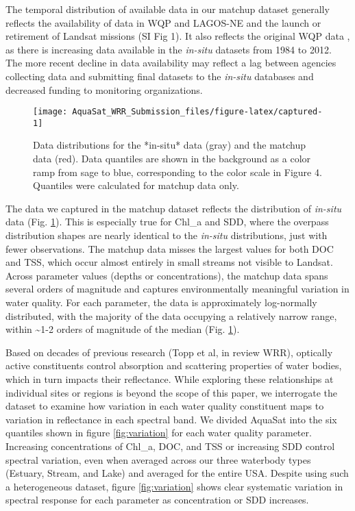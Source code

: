 \documentclass[draft,linenumbers]{agujournal2018}
\begin{document}
The temporal distribution of available data in our matchup dataset
generally reflects the availability of data in WQP and LAGOS-NE and the
launch or retirement of Landsat missions (SI Fig 1). It also reflects
the original WQP data \citep{Read2017}, as there is increasing data
available in the \emph{in-situ} datasets from 1984 to 2012. The more
recent decline in data availability may reflect a lag between agencies
collecting data and submitting final datasets to the \emph{in-situ}
databases and decreased funding \citep{Myers2017} to monitoring
organizations.

\begin{figure}[h]
\texttt{[image: AquaSat\_WRR\_Submission\_files/figure-latex/captured-1]} \caption{Data distributions for the *in-situ* data (gray) and the matchup data (red). Data quantiles are shown in the background as a color ramp from sage to blue, corresponding to the color scale in Figure 4. Quantiles were calculated for matchup data only.}\label{fig:captured}
\end{figure}

The data we captured in the matchup dataset reflects the distribution of
\emph{in-situ} data (Fig. \ref{fig:captured}). This is especially true
for Chl\_a and SDD, where the overpass distribution shapes are nearly
identical to the \emph{in-situ} distributions, just with fewer
observations. The matchup data misses the largest values for both DOC
and TSS, which occur almost entirely in small streams not visible to
Landsat. Across parameter values (depths or concentrations), the matchup
data spans several orders of magnitude and captures environmentally
meaningful variation in water quality. For each parameter, the data is
approximately log-normally distributed, with the majority of the data
occupying a relatively narrow range, within \textasciitilde{}1-2 orders
of magnitude of the median (Fig. \ref{fig:captured}).

Based on decades of previous research (Topp et al, in review WRR),
optically active constituents control absorption and scattering
properties of water bodies, which in turn impacts their reflectance.
While exploring these relationships at individual sites or regions is
beyond the scope of this paper, we interrogate the dataset to examine
how variation in each water quality constituent maps to variation in
reflectance in each spectral band. We divided AquaSat into the six
quantiles shown in figure \ref{fig:variation} for each water quality
parameter. Increasing concentrations of Chl\_a, DOC, and TSS or
increasing SDD control spectral variation, even when averaged across our
three waterbody types (Estuary, Stream, and Lake) and averaged for the
entire USA. Despite using such a heterogeneous dataset, figure
\ref{fig:variation} shows clear systematic variation in spectral
response for each parameter as concentration or SDD increases.
\end{document}
